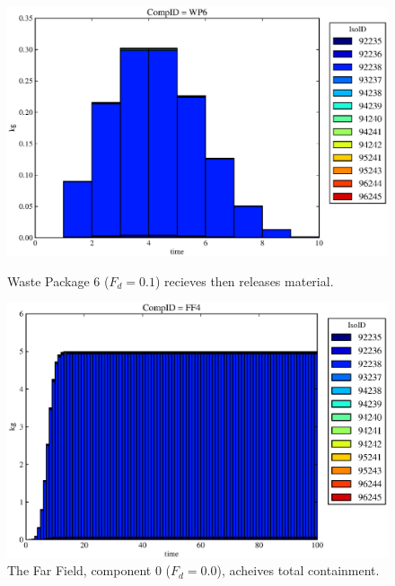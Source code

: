 \begin{figure}[ht]
\begin{minipage}[b]{0.45\linewidth}
\end{minipage}
\hspace{0.05\linewidth}
\begin{minipage}[b]{0.45\linewidth}
  \includegraphics[width=\textwidth]{./chapters/demonstration/base/drIV2.eps}
  \caption[Case DRIV Waste Package Contaminants.]{ 
    Waste Package 6 ($F_d = 0.1$) recieves then releases material. 
    }
  \label{fig:drIVwp6}

  \includegraphics[width=\textwidth]{./chapters/demonstration/base/drIV0.eps}
  \caption[Case DRIV Waste Package Contaminants.]{ 
    The Far Field, component 0 ($F_d = 0.0$), acheives total containment.
    }
  \label{fig:drIVff0}


  \end{minipage}
\end{figure}
